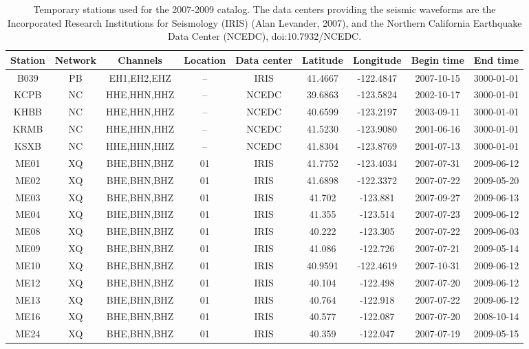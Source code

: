 \documentclass[draft]{agujournal2019}
\begin{document}
\begin{table}[hbt!]
\caption{Temporary stations used for the 2007-2009 catalog. The data centers providing the seismic waveforms are the Incorporated Research Institutions for Seismology (IRIS) (Alan Levander, 2007), and the Northern California Earthquake Data Center (NCEDC), doi:10.7932/NCEDC.}
\centering
\footnotesize
\begin{tabular}{c c c c c c c c c}
\hline
Station & Network & Channels & Location & Data center & Latitude & Longitude & Begin time & End time \\
\hline
B039 & PB & EH1,EH2,EHZ & -- & IRIS & 41.4667 & -122.4847 & 2007-10-15 & 3000-01-01 \\
KCPB & NC & HHE,HHN,HHZ & -- & NCEDC & 39.6863 & -123.5824 & 2002-10-17 & 3000-01-01 \\
KHBB & NC & HHE,HHN,HHZ & -- & NCEDC & 40.6599 & -123.2197 & 2003-09-11 & 3000-01-01 \\
KRMB & NC & HHE,HHN,HHZ & -- & NCEDC & 41.5230 & -123.9080 & 2001-06-16 & 3000-01-01 \\
KSXB & NC & HHE,HHN,HHZ & -- & NCEDC & 41.8304 & -123.8769 & 2001-07-13 & 3000-01-01 \\
ME01 & XQ & BHE,BHN,BHZ & 01 & IRIS & 41.7752 & -123.4034 & 2007-07-31 & 2009-06-12 \\
ME02 & XQ & BHE,BHN,BHZ & 01 & IRIS & 41.6898 & -122.3372 & 2007-07-22 & 2009-05-20 \\
ME03 & XQ & BHE,BHN,BHZ & 01 & IRIS & 41.702 & -123.881 & 2007-09-27 & 2009-06-13 \\
ME04 & XQ & BHE,BHN,BHZ & 01 & IRIS & 41.355 & -123.514 & 2007-07-23 & 2009-06-12 \\
ME08 & XQ & BHE,BHN,BHZ & 01 & IRIS & 40.222 & -123.305 & 2007-07-22 & 2009-06-03 \\
ME09 & XQ & BHE,BHN,BHZ & 01 & IRIS & 41.086 & -122.726 & 2007-07-21 & 2009-05-14 \\
ME10 & XQ & BHE,BHN,BHZ & 01 & IRIS & 40.9591 & -122.4619 & 2007-10-31 & 2009-06-12 \\
ME12 & XQ & BHE,BHN,BHZ & 01 & IRIS & 40.104 & -122.498 & 2007-07-20 & 2009-06-12 \\
ME13 & XQ & BHE,BHN,BHZ & 01 & IRIS & 40.764 & -122.918 & 2007-07-22 & 2009-06-12 \\
ME16 & XQ & BHE,BHN,BHZ & 01 & IRIS & 40.577 &  -122.087 & 2007-07-20 & 2008-10-14 \\
ME24 & XQ & BHE,BHN,BHZ & 01 & IRIS & 40.359 & -122.047 & 2007-07-19 & 2009-05-15 \\

\end{tabular}
\end{table}
\end{document}
